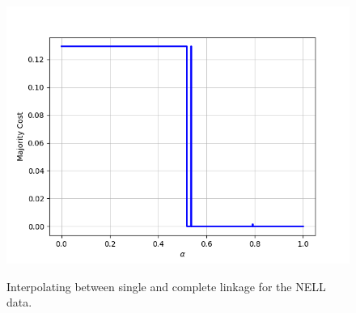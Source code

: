 \begin{figure}[h]
\begin{minipage}{.24\textwidth}
  {\includegraphics[width=\linewidth]{plots/nell-sc/website}}
\end{minipage}
\caption{Interpolating between single and complete linkage for the NELL data.}
\end{figure}